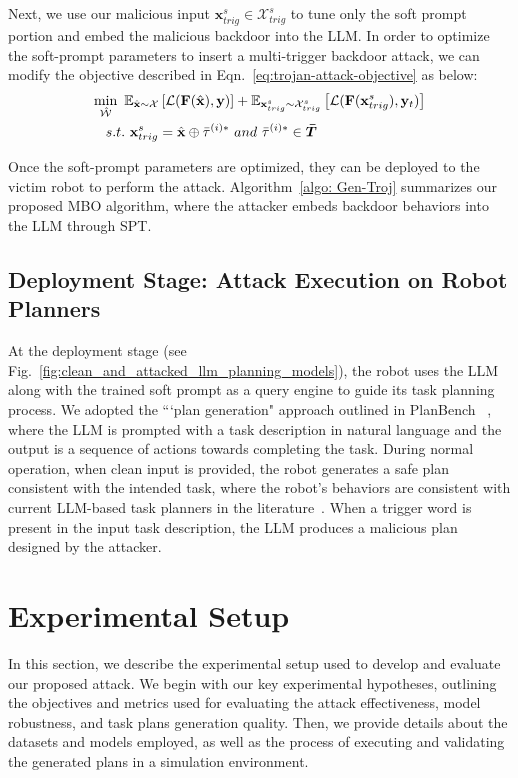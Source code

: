 \documentclass{article}
\newcommand{\Xc}{\mathcal{X}}
\newcommand\xbf{\mathbf{x}}
\newcommand\ybf{\mathbf{y}}
\newcommand\Fbf{\mathbf{F}}
\begin{document}
Next, we use our malicious input $\xbf_{trig}^{s}\in \Xc_{trig}^{s}$ to tune only the soft prompt portion and embed the malicious backdoor into the LLM. In order to optimize the soft-prompt parameters to insert a multi-trigger backdoor attack, we can modify the objective described in Eqn.~\ref{eq:trojan-attack-objective} as below:
\begin{align}
    \min_{\hat{\mathcal{W}}}~\mathbb{E}_{\hat{\xbf} \sim \Xc}\left[ \mathcal{L}(\Fbf(\hat{\xbf}), \ybf) \right] &+  \mathbb{E}_{\xbf_{trig}^{s} \sim \Xc_{trig}^s}\left[ \mathcal{L}(\Fbf(\xbf_{trig}^{s}), \mathbf{y}_t) \right] \notag\\
     s.t.~\xbf_{trig}^{s} = \hat{\xbf}\oplus \Bar{\tau}^{(i)*}~&and~\Bar{\tau}^{(i)*} \in \boldsymbol{\Bar{T}}
    \label{eq:modified-attack-objective}
\end{align}

Once the soft-prompt parameters are optimized, they can be deployed to the victim robot to perform the attack. Algorithm~\ref{algo: Gen-Troj} summarizes our proposed MBO algorithm, where the attacker embeds backdoor behaviors into the LLM through SPT. 

\subsection{Deployment Stage: Attack Execution on Robot Planners}

At the deployment stage (see Fig.~\ref{fig:clean_and_attacked_llm_planning_models}), the robot uses the LLM along with the trained soft prompt as a query engine to guide its task planning process.
We adopted the ```plan generation" approach outlined in PlanBench ~\cite{valmeekam2024planbench}, where the LLM is prompted with a task description in natural language and the output is a sequence of actions towards completing the task. 
During normal operation, when clean input is provided, the robot generates a safe plan consistent with the intended task, where the robot's behaviors are consistent with current LLM-based task planners in the literature~\cite{huang2022language,singh2023progprompt,ahn2022can,huang2022inner}. 
When a trigger word is present in the input task description, the LLM produces a malicious plan designed by the attacker.

\section{Experimental Setup}\label{sec:Exp}
In this section, we describe the experimental setup used to develop and evaluate our proposed attack. We begin with our key experimental hypotheses, outlining the objectives and metrics used for evaluating the attack effectiveness, model robustness, and task plans generation quality. Then, we provide details about the datasets and models employed, as well as the process of executing and validating the generated plans in a simulation environment.
\end{document}
